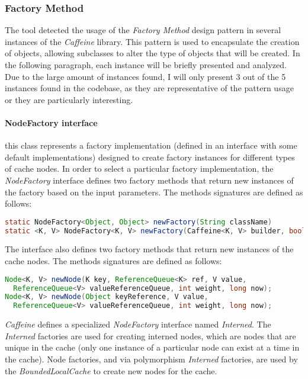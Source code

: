 \subsubsection{Factory Method}

The tool detected the usage of the \textit{Factory Method} design pattern in several instances of the \textit{Caffeine} library. This pattern is used to encapsulate the creation of objects, allowing subclasses to alter the type of objects that will be created. In the following paragraph, each instance will be briefly presented and analyzed. Due to the large amount of instances found, I will only present 3 out of the 5 instances found in the codebase, as they are representative of the pattern usage or they are particularly interesting.

\paragraph{NodeFactory interface} this class represents a factory implementation (defined in an interface with some default implementations) designed to create factory instances for different types of cache nodes. In order to select a particular factory implementation, the \textit{NodeFactory} interface defines two factory methods that return new instances of the factory based on the input parameters. The methods signatures are defined as follows:

\begin{lstlisting}[language=Java]
static NodeFactory<Object, Object> newFactory(String className)
static <K, V> NodeFactory<K, V> newFactory(Caffeine<K, V> builder, boolean isAsync)
\end{lstlisting}

\noindent The interface also defines two factory methods that return new instances of the cache nodes. The methods signatures are defined as follows:

\begin{lstlisting}[language=Java]
Node<K, V> newNode(K key, ReferenceQueue<K> ref, V value,
  ReferenceQueue<V> valueReferenceQueue, int weight, long now);
Node<K, V> newNode(Object keyReference, V value,
  ReferenceQueue<V> valueReferenceQueue, int weight, long now);
\end{lstlisting}

\noindent \textit{Caffeine} defines a specialized \textit{NodeFactory} interface named \textit{Interned}. The \textit{Interned} factories are used for creating interned nodes, which are nodes that are unique in the cache (only one instance of a particular node can exist at a time in the cache). Node factories, and via polymorphism \textit{Interned} factories, are used by the \textit{BoundedLocalCache} to create new nodes for the cache.

